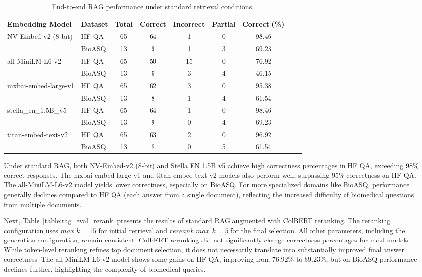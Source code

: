 \documentclass[pdflatex,sn-mathphys-num]{sn-jnl}%
\theoremstyle{thmstyleone}%
\theoremstyle{thmstyletwo}%
\theoremstyle{thmstylethree}%
\begin{document}
\begin{table}[h]
\centering
\small
\begin{tabular}{l l c c c c c c c}
\hline
\textbf{Embedding Model} & \textbf{Dataset} & \textbf{Total} & \textbf{Correct} & \textbf{Incorrect} & \textbf{Partial} & \textbf{Correct (\%)} \\
\hline
\multirow{2}{*}{NV-Embed-v2 (8-bit)} 
 & HF QA  & 65 & 64 & 1 & 0 & 98.46 \\
 & BioASQ & 13 & 9  & 1 & 3 & 69.23 \\
\hline
\multirow{2}{*}{all-MiniLM-L6-v2} 
 & HF QA  & 65 & 50 & 15 & 0 & 76.92 \\
 & BioASQ & 13 & 6  & 3  & 4 & 46.15 \\
\hline
\multirow{2}{*}{mxbai-embed-large-v1} 
 & HF QA  & 65 & 62 & 3 & 0 & 95.38 \\
 & BioASQ & 13 & 8  & 1 & 4 & 61.54 \\
\hline
\multirow{2}{*}{stella\_en\_1.5B\_v5} 
 & HF QA  & 65 & 64 & 1 & 0 & 98.46 \\
 & BioASQ & 13 & 9  & 0 & 4 & 69.23 \\
\hline
\multirow{2}{*}{titan-embed-text-v2} 
 & HF QA  & 65 & 63 & 2 & 0 & 96.92 \\
 & BioASQ & 13 & 8  & 0 & 5 & 61.54 \\
\hline
\end{tabular}
\caption{End-to-end RAG performance under standard retrieval conditions.}
\label{table:rag_eval_standard}
\end{table}

Under standard RAG, both NV-Embed-v2 (8-bit) and Stella EN 1.5B v5 achieve high correctness percentages in HF QA, exceeding 98\% correct responses. The mxbai-embed-large-v1 and titan-embed-text-v2 models also perform well, surpassing 95\% correctness on HF QA. The all-MiniLM-L6-v2 model yields lower correctness, especially on BioASQ. For more specialized domains like BioASQ, performance generally declines compared to HF QA (each answer from a single document), reflecting the increased difficulty of biomedical questions from multiple documents.

Next, Table~\ref{table:rag_eval_rerank} presents the results of standard RAG augmented with ColBERT reranking. The reranking configuration uses $max\_k=15$ for initial retrieval and $rereank\_max\_k=5$ for the final selection. All other parameters, including the generation configuration, remain consistent. ColBERT reranking did not significantly change correctness percentages for most models. While token-level reranking refines top document selection, it does not necessarily translate into substantially improved final answer correctness. The all-MiniLM-L6-v2 model shows some gains on HF QA, improving from 76.92\% to 89.23\%, but on BioASQ performance declines further, highlighting the complexity of biomedical queries.
\end{document}
